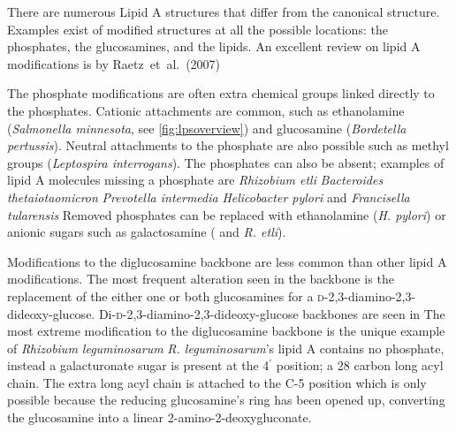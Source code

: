 There are numerous Lipid A structures that differ from the canonical structure. Examples exist of modified structures at all the possible locations: the phosphates, the
glucosamines, and the lipids. An excellent review on lipid A modifications is by Raetz~et~al.~(2007)

 The phosphate modifications are often extra chemical groups linked directly to the phosphates. Cationic attachments are common, such as ethanolamine (\eg \textit{Salmonella
minnesota}, see \cref{fig:lpsoverview}) and glucosamine (\eg \textit{Bordetella pertussis}). Neutral attachments to the phosphate are also possible
such as methyl groups (\eg \textit{Leptospira interrogans}). The phosphates can also be absent; examples of lipid A molecules missing a phosphate
are \textit{Rhizobium etli} \textit{Bacteroides thetaiotaomicron} \textit{Prevotella intermedia}
\textit{Helicobacter pylori} and \textit{Francisella tularensis} Removed phosphates can be replaced with ethanolamine
(\eg \textit{H. pylori}) or anionic sugars such as galactosamine (\eg \caulobacter{} and \textit{R.
etli}).
 
Modifications to the diglucosamine backbone are less common than other lipid A modifications. The most frequent alteration seen in the backbone is the replacement of the either one
or both glucosamines for a \textsc{d}-2,3-diamino-2,3-dideoxy-glucose. Di-\textsc{d}-2,3-diamino-2,3-dideoxy-glucose backbones are seen in \caulobacter{}
The most extreme modification to the diglucosamine backbone is the unique example of \textit{Rhizobium leguminosarum} \textit{R. leguminosarum}'s lipid
A contains no phosphate, instead a galacturonate sugar is present at the 4$^\prime$ position; a 28 carbon long acyl chain. The extra long acyl chain is attached to the C-5 position
which is only possible because the reducing glucosamine's ring has been opened up, converting the glucosamine into a linear 2-amino-2-deoxygluconate.

